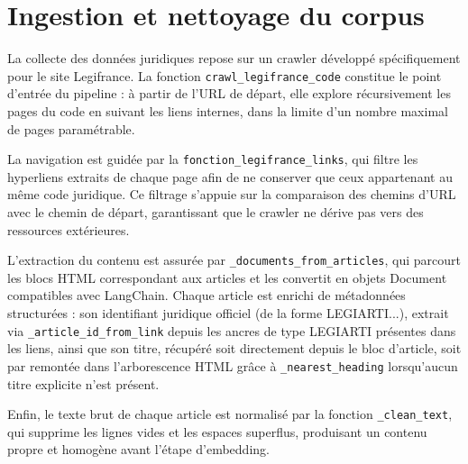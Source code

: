 \section{Ingestion et nettoyage du corpus}\label{sec:crawler}
La collecte des données juridiques repose sur un crawler développé spécifiquement pour le site Legifrance. La fonction \texttt{crawl\_legifrance\_code} constitue le point d'entrée du pipeline : à partir de l'URL de départ, elle explore récursivement les pages du code en suivant les liens internes, dans la limite d'un nombre maximal de pages paramétrable.

La navigation est guidée par la \texttt{fonction\_legifrance\_links}, qui filtre les hyperliens extraits de chaque page afin de ne conserver que ceux appartenant au même code juridique. Ce filtrage s'appuie sur la comparaison des chemins d'URL avec le chemin de départ, garantissant que le crawler ne dérive pas vers des ressources extérieures.

L'extraction du contenu est assurée par \texttt{\_documents\_from\_articles}, qui parcourt les blocs HTML correspondant aux articles et les convertit en objets Document compatibles avec LangChain. Chaque article est enrichi de métadonnées structurées : son identifiant juridique officiel (de la forme LEGIARTI...), extrait via \texttt{\_article\_id\_from\_link} depuis les ancres de type LEGIARTI présentes dans les liens, ainsi que son titre, récupéré soit directement depuis le bloc d'article, soit par remontée dans l'arborescence HTML grâce à \texttt{\_nearest\_heading} lorsqu'aucun titre explicite n'est présent.

Enfin, le texte brut de chaque article est normalisé par la fonction \texttt{\_clean\_text}, qui supprime les lignes vides et les espaces superflus, produisant un contenu propre et homogène avant l'étape d'embedding.


